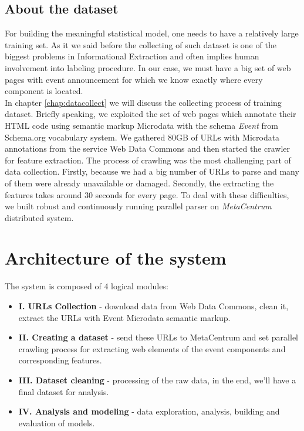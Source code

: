 \subsection*{About the dataset}
For building the meaningful statistical model, one needs to have a relatively large training set. As it we said before the collecting of such dataset is one of the biggest problems in Informational Extraction and often implies human involvement into labeling procedure. In our case, we must have a big set of web pages with event announcement for which we know exactly where every component is located.\\  

In chapter \ref{chap:datacollect} we will discuss the collecting process of training dataset. Briefly speaking, we exploited the set of web pages which annotate their HTML code using semantic markup Microdata with the schema \textit{Event} from Schema.org vocabulary system. We gathered 80GB of URLs with Microdata annotations from the service Web Data Commons and then started the crawler for feature extraction. The process of crawling was the most challenging part of data collection. Firstly, because we had a big number of URLs to parse and many of them were already unavailable or damaged. Secondly, the extracting the features takes around 30 seconds for every page. To deal with these difficulties, we built robust and continuously running parallel parser on \textit{MetaCentrum} \cite{MetaCentrum} distributed system. 

\section{Architecture of the system}
\label{sec:arch}

The system is composed of 4 logical modules:

\begin{itemize}
    \item \textbf{I. URLs Collection} - download data from Web Data Commons, clean it, extract the URLs with Event Microdata semantic markup.
    \item \textbf{II. Creating a dataset} - send these URLs to MetaCentrum and set parallel crawling process for extracting web elements of the event components and corresponding features.
    \item \textbf{III. Dataset cleaning} - processing of the raw data, in the end, we'll have a final dataset for analysis.
    \item \textbf{IV. Analysis and modeling} - data exploration, analysis, building and evaluation of models.
\end{itemize}

